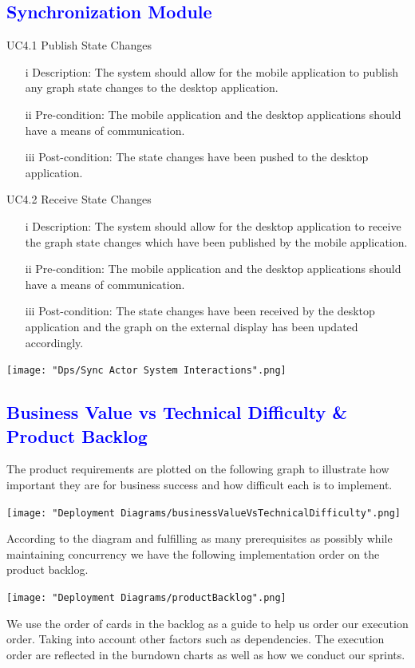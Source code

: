 \documentclass[12pt]{article}
\begin{document}
\textcolor{blue}{\subsection{Synchronization Module}}
\begin{flushleft}
UC4.1 Publish State Changes
\begin{itemize}
\item[i] Description: The system should allow for the mobile application to publish any graph state changes to the desktop application. 
\item[ii] Pre-condition: The mobile application and the desktop applications should have a means of communication.
\item[iii] Post-condition: The state changes have been pushed to the desktop application.
\end{itemize}
\end{flushleft}

\begin{flushleft}
UC4.2 Receive State Changes
\begin{itemize}
\item[i]Description: The system should allow for the desktop application to receive the graph state changes which have been published by the mobile application.
\item[ii] Pre-condition: The mobile application and the desktop applications should have a means of communication.
\item[iii] Post-condition: The state changes have been received by the desktop application and the graph on the external display has been updated accordingly.
\end{itemize}
\end{flushleft}

\texttt{[image: "Dps/Sync Actor System Interactions".png]}

\textcolor{blue}{\section{Business Value vs Technical Difficulty \& Product Backlog}}
\begin{flushleft}
 	
 	The product requirements are plotted on the following graph to illustrate how important they are for business success and how difficult each is to implement.
	
	\texttt{[image: "Deployment Diagrams/businessValueVsTechnicalDifficulty".png]}
	
	According to the diagram and fulfilling as many prerequisites as possibly while maintaining concurrency we have the following implementation order on the product backlog.
	
	\texttt{[image: "Deployment Diagrams/productBacklog".png]}

\end{flushleft}

\begin{flushleft}

	We use the order of cards in the backlog as a guide to help us order our execution order. Taking into account other factors such as dependencies. The execution order are reflected in the burndown charts as well as how we conduct our sprints.
	
\end{flushleft}
\end{document}

